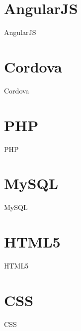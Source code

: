 \section{AngularJS}
	\par AngularJS
	
\section{Cordova}
	\par Cordova

\section{PHP}
	\par PHP

\section{MySQL}
	\par MySQL

\section{HTML5}
	\par HTML5

\section{CSS}
	\par CSS